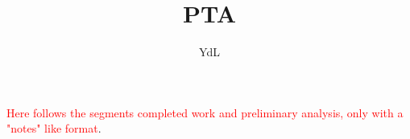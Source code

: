 \documentclass[onecolumn,fleqn]{revtex4}
\newcommand{\rmrk}[1]{\textcolor{red}{#1}}
\begin{document}
\title{PTA}

\author{YdL}



\rmrk{Here follows the segments completed work and
preliminary analysis, only with a "notes" like format}.




%

\nocite{apsrev41Control}

\end{document}
